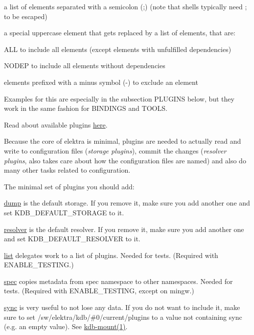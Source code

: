 \begin{DoxyItemize}
\item a list of elements separated with a semicolon ({\ttfamily ;}) (note that shells typically need {\ttfamily ;} to be escaped)
\item a special uppercase element that gets replaced by a list of elements, that are\+:
\begin{DoxyItemize}
\item {\ttfamily A\+LL} to include all elements (except elements with unfulfilled dependencies)
\item {\ttfamily N\+O\+D\+EP} to include all elements without dependencies
\end{DoxyItemize}
\item elements prefixed with a minus symbol ({\ttfamily -\/}) to exclude an element
\end{DoxyItemize}

Examples for this are especially in the subsection {\ttfamily P\+L\+U\+G\+I\+NS} below, but they work in the same fashion for {\ttfamily B\+I\+N\+D\+I\+N\+GS} and {\ttfamily T\+O\+O\+LS}.

Read about available plugins \hyperlink{src_plugins_README_md}{here}.

Because the core of elektra is minimal, plugins are needed to actually read and write to configuration files ({\itshape storage plugins}), commit the changes ({\itshape resolver plugins}, also takes care about how the configuration files are named) and also do many other tasks related to configuration.

The minimal set of plugins you should add\+:


\begin{DoxyItemize}
\item \hyperlink{autotoc_md194_src_plugins_dump_README_md}{dump} is the default storage. If you remove it, make sure you add another one and set {\ttfamily K\+D\+B\+\_\+\+D\+E\+F\+A\+U\+L\+T\+\_\+\+S\+T\+O\+R\+A\+GE} to it.
\item \hyperlink{autotoc_md586_src_plugins_resolver_README_md}{resolver} is the default resolver. If you remove it, make sure you add another one and set {\ttfamily K\+D\+B\+\_\+\+D\+E\+F\+A\+U\+L\+T\+\_\+\+R\+E\+S\+O\+L\+V\+ER} to it.
\item \hyperlink{autotoc_md358_src_plugins_list_README_md}{list} delegates work to a list of plugins. Needed for tests. (Required with {\ttfamily E\+N\+A\+B\+L\+E\+\_\+\+T\+E\+S\+T\+I\+NG}.)
\item \hyperlink{autotoc_md612_src_plugins_spec_README_md}{spec} copies metadata from spec namespace to other namespaces. Needed for tests. (Required with {\ttfamily E\+N\+A\+B\+L\+E\+\_\+\+T\+E\+S\+T\+I\+NG}, except on mingw.)
\item \hyperlink{autotoc_md631_src_plugins_sync_README_md}{sync} is very useful to not lose any data. If you do not want to include it, make sure to set {\ttfamily /sw/elektra/kdb/\#0/current/plugins} to a value not containing sync (e.\+g. an empty value). See \hyperlink{doc_help_kdb-mount_md}{kdb-\/mount(1)}.
\end{DoxyItemize}

